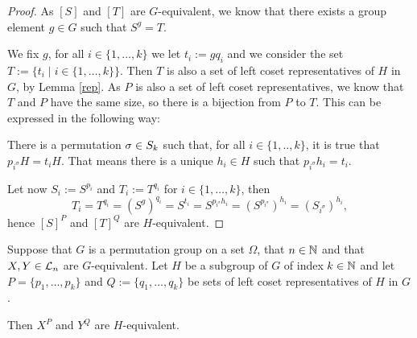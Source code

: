 \begin{proof}
As \([S]\) and \([T]\) are \(G\)-equivalent, we know that there exists a group
element $g \in G$ such that $S^g=T$.

We fix $g$, for all $i \in \{1,\dots,k\}$ we let $t_i:=gq_i$ and we consider the
set $T:=\{t_i \mid i \in \{1,\dots,k\}\}$. Then $T$ is also a set of left coset
representatives of $H$ in $G$, by Lemma \ref{rep}. As $P$ is also a set of left
coset representatives, we know that $T$ and $P$ have the same size, so there is
a bijection from $P$ to $T$. This can be expressed in the following way:

There is a permutation $\sigma \in S_{k}$ such that, for all $i \in \{1,..,k\}$,
it is true that $p_{i^\sigma}H=t_iH$. That means  there is a unique $h_i
\in H$ such that $p_{i^\sigma}h_i=t_i$.

Let now $S_i:=S^{p_i}$ and $T_i:=T^{q_i}$ for $i \in \{1,\dots,k\}$, then
\[
  T_i=T^{q_i}=(S^g)^{q_i}=S^{t_i}=S^{p_{i^\sigma}h_i}=(S^{p_{i^\sigma}})^{h_i}=(S_{i^\sigma})^{h_i},
\]
hence $[S]^P$ and $[T]^Q$ are $H$-equivalent.
\end{proof}

\begin{lem}\label{equi}
  Suppose that $G$ is a permutation group on a set \(\Omega\), that $n \in \mathbb{N}$ and that
  $X,Y \in \mathcal{L}_n$ are $G$-equivalent. Let \(H\) be a subgroup of \(G\) of index $k \in \mathbb{N}$ and let
  $P=\{p_1,\dots,p_k\}$ and $Q:=\{q_1,\dots,q_k\}$ be sets of left coset representatives of $H$ in $G$.

  Then $X^P$ and $Y^Q$ are \(H\)-equivalent.
\end{lem}

